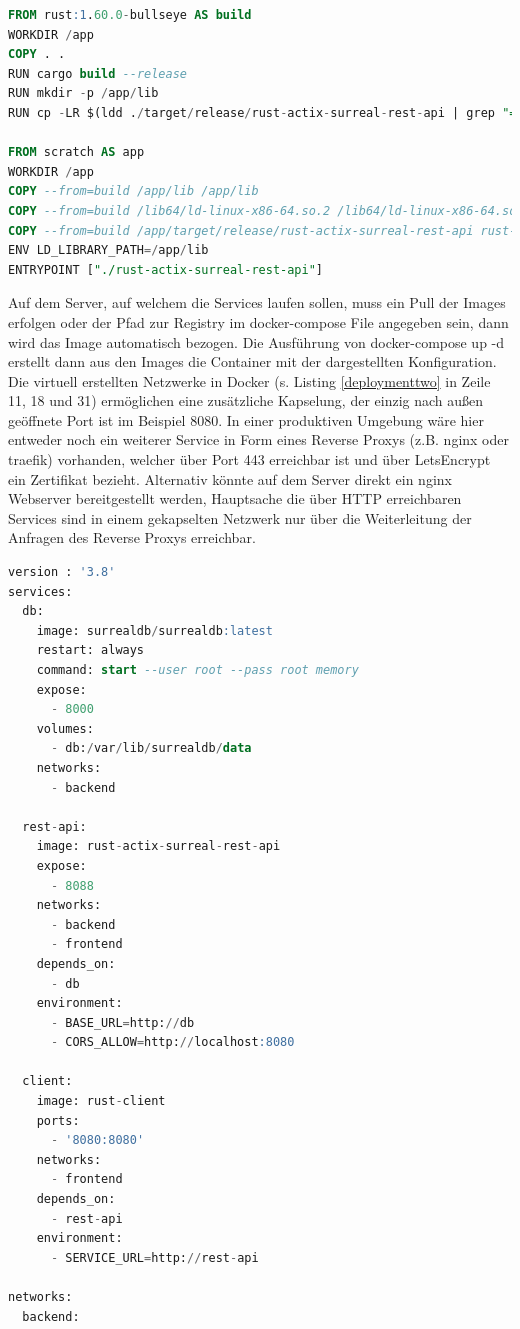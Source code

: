 \documentclass[notitlepage, hidelinks]{article}
\begin{document}
\begin{lstlisting}[language=SQL,frame=single,caption=Dockerfile für die Erstellung des REST-API Images ,label=deploymentone]
FROM rust:1.60.0-bullseye AS build
WORKDIR /app
COPY . .
RUN cargo build --release
RUN mkdir -p /app/lib
RUN cp -LR $(ldd ./target/release/rust-actix-surreal-rest-api | grep "=>" | cut -d ' ' -f 3) /app/lib

FROM scratch AS app
WORKDIR /app
COPY --from=build /app/lib /app/lib
COPY --from=build /lib64/ld-linux-x86-64.so.2 /lib64/ld-linux-x86-64.so.2
COPY --from=build /app/target/release/rust-actix-surreal-rest-api rust-actix-surreal-rest-api
ENV LD_LIBRARY_PATH=/app/lib
ENTRYPOINT ["./rust-actix-surreal-rest-api"]
\end{lstlisting}

Auf dem Server, auf welchem die Services laufen sollen, muss ein Pull der Images erfolgen oder der Pfad zur Registry im docker-compose File angegeben sein, dann wird das Image automatisch bezogen. Die Ausführung von docker-compose up -d erstellt dann aus den Images die Container mit der dargestellten Konfiguration. Die virtuell erstellten Netzwerke in Docker (s. Listing \ref{deploymenttwo} in Zeile 11, 18 und 31) ermöglichen eine zusätzliche Kapselung, der einzig nach außen geöffnete Port ist im Beispiel 8080. In einer produktiven Umgebung wäre hier entweder noch ein weiterer Service in Form eines Reverse Proxys (z.B. nginx oder traefik) vorhanden, welcher über Port 443 erreichbar ist und über LetsEncrypt ein Zertifikat bezieht. Alternativ könnte auf dem Server direkt ein nginx Webserver bereitgestellt werden, Hauptsache die über HTTP erreichbaren Services sind in einem gekapselten Netzwerk nur über die Weiterleitung der Anfragen des Reverse Proxys erreichbar. 

\begin{lstlisting}[language=SQL,frame=single,caption=docker-compose.yml zur Bereitstellung des kompletten Stacks,label=deploymenttwo]
version : '3.8'
services:
  db:
    image: surrealdb/surrealdb:latest
    restart: always
    command: start --user root --pass root memory
    expose:
      - 8000
    volumes:
      - db:/var/lib/surrealdb/data
    networks:
      - backend

  rest-api:
    image: rust-actix-surreal-rest-api    
    expose: 
      - 8088
    networks:
      - backend
      - frontend
    depends_on:
      - db
    environment:
      - BASE_URL=http://db
      - CORS_ALLOW=http://localhost:8080
      
  client:
    image: rust-client    
    ports: 
      - '8080:8080'
    networks:
      - frontend
    depends_on:
      - rest-api
    environment:
      - SERVICE_URL=http://rest-api

networks:
  backend:
\end{lstlisting}
\end{document}
